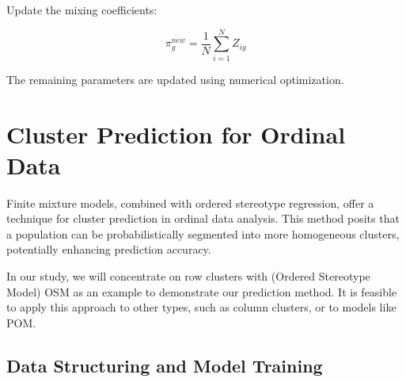 \documentclass{article}
\begin{document}
Update the mixing coefficients:

\begin{equation}
\pi_g^{new} = \frac{1}{N} \sum_{i=1}^{N} Z_{ig}
\end{equation}

The remaining parameters are updated using numerical optimization.








\section{Cluster Prediction for Ordinal Data}

Finite mixture models, combined with ordered stereotype regression, offer a technique for cluster prediction in ordinal data analysis. This method posits that a population can be probabilistically segmented into more homogeneous clusters, potentially enhancing prediction accuracy.

In our study, we will concentrate on row clusters with (Ordered Stereotype Model) OSM as an example to demonstrate our prediction method. It is feasible to apply this approach to other types, such as column clusters, or to models like POM.

\subsection{Data Structuring and Model Training}
\end{document}
